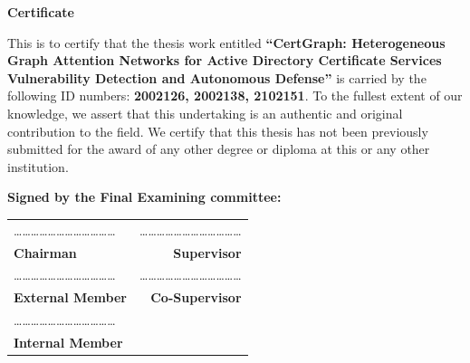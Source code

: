 \thispagestyle{empty}
\begin{center}
    {\fontsize{18pt}{22pt}\selectfont \textbf{Certificate} \par}
\end{center}

\vspace{0.8cm}
\noindent This is to certify that the thesis work entitled \textbf{``CertGraph: Heterogeneous Graph Attention Networks for Active Directory Certificate Services Vulnerability Detection and Autonomous Defense''} is carried by the following ID numbers: \textbf{2002126, 2002138, 2102151}. To the fullest extent of our knowledge, we assert that this undertaking is an authentic and original contribution to the field. We certify that this thesis has not been previously submitted for the award of any other degree or diploma at this or any other institution.

\vspace{1.0cm}
\noindent \textbf{Signed by the Final Examining committee:}

\vfill
\noindent
\begin{tabular*}{\textwidth}{@{\extracolsep{\fill}}lr}
    \dots\dots\dots\dots\dots\dots\dots\dots\dots\dots\dots\dots & \dots\dots\dots\dots\dots\dots\dots\dots\dots\dots\dots\dots \\
    \textbf{Chairman} & \textbf{Supervisor} \\[1.8cm]
    \dots\dots\dots\dots\dots\dots\dots\dots\dots\dots\dots\dots & \dots\dots\dots\dots\dots\dots\dots\dots\dots\dots\dots\dots \\
    \textbf{External Member} & \textbf{Co-Supervisor} \\[1.8cm]
    \multicolumn{2}{l}{\dots\dots\dots\dots\dots\dots\dots\dots\dots\dots\dots\dots} \\
    \multicolumn{2}{l}{\textbf{Internal Member}}
\end{tabular*}
